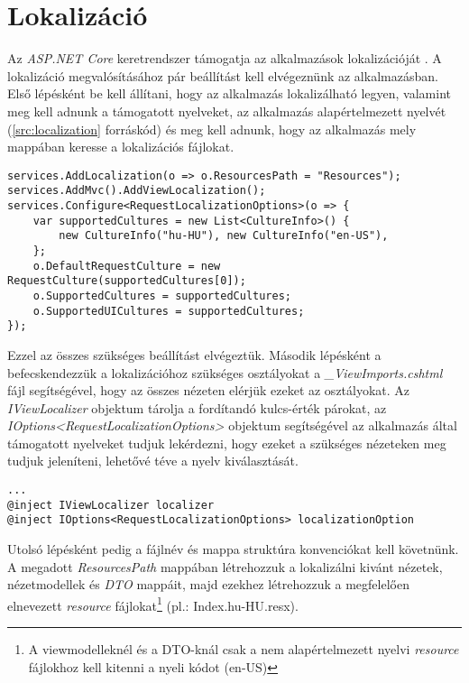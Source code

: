 \section{Lokalizáció}
\label{sec:localization}
Az \emph{ASP.NET Core} keretrendszer támogatja az alkalmazások lokalizációját \cite{Localization}. A lokalizáció megvalósításához pár beállítást kell elvégeznünk az alkalmazásban. Első lépésként be kell állítani, hogy az alkalmazás lokalizálható legyen, valamint meg kell adnunk a támogatott nyelveket, az alkalmazás alapértelmezett nyelvét (\ref{src:localization} forráskód) és meg kell adnunk, hogy az alkalmazás mely mappában keresse a lokalizációs fájlokat.
\begin{lstlisting}[language={[Sharp]C}]
services.AddLocalization(o => o.ResourcesPath = "Resources");
services.AddMvc().AddViewLocalization();
services.Configure<RequestLocalizationOptions>(o => {
	var supportedCultures = new List<CultureInfo>() {
		new CultureInfo("hu-HU"), new CultureInfo("en-US"),
	};
	o.DefaultRequestCulture = new RequestCulture(supportedCultures[0]);
	o.SupportedCultures = supportedCultures;
	o.SupportedUICultures = supportedCultures;
});
\end{lstlisting}
Ezzel az összes szükséges beállítást elvégeztük. Második lépésként a befecskendezzük a lokalizációhoz szükséges osztályokat a \emph{\_ViewImports.cshtml} fájl segítségével, hogy az összes nézeten elérjük ezeket az osztályokat. Az \emph{IViewLocalizer} objektum tárolja a fordítandó kulcs-érték párokat, az \emph{IOptions<RequestLocalizationOptions>} objektum segítségével az alkalmazás által támogatott nyelveket tudjuk lekérdezni, hogy ezeket a szükséges nézeteken meg tudjuk jeleníteni, lehetővé téve a nyelv kiválasztását.
\begin{lstlisting}[language={[Sharp]C}]
...
@inject IViewLocalizer localizer
@inject IOptions<RequestLocalizationOptions> localizationOption
\end{lstlisting}
Utolsó lépésként pedig a fájlnév és mappa struktúra konvenciókat kell követnünk. A megadott \emph{ResourcesPath} mappában létrehozzuk a lokalizálni kivánt nézetek, nézetmodellek és \emph{DTO} mappáit, majd ezekhez létrehozzuk a megfelelően elnevezett \emph{resource} fájlokat\footnote{A viewmodelleknél és a DTO-knál csak a nem alapértelmezett nyelvi \emph{resource} fájlokhoz kell kitenni a nyeli kódot (en-US)} (pl.: Index.hu-HU.resx).
